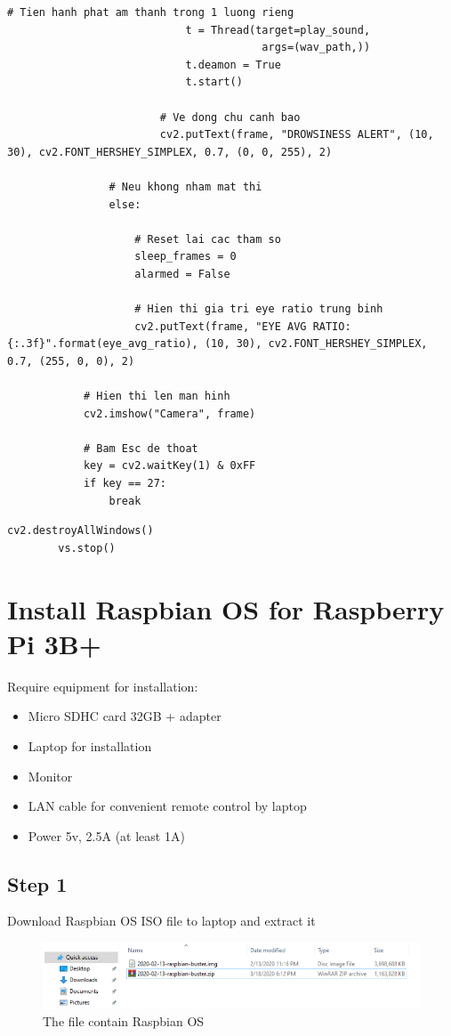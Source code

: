 \begin{lstlisting}[caption={Doc tu camera}]
                            # Tien hanh phat am thanh trong 1 luong rieng
                            t = Thread(target=play_sound,
                                        args=(wav_path,))
                            t.deamon = True
                            t.start()

                        # Ve dong chu canh bao
                        cv2.putText(frame, "DROWSINESS ALERT", (10, 30), cv2.FONT_HERSHEY_SIMPLEX, 0.7, (0, 0, 255), 2)

                # Neu khong nham mat thi
                else:

                    # Reset lai cac tham so
                    sleep_frames = 0
                    alarmed = False

                    # Hien thi gia tri eye ratio trung binh
                    cv2.putText(frame, "EYE AVG RATIO: {:.3f}".format(eye_avg_ratio), (10, 30),	cv2.FONT_HERSHEY_SIMPLEX, 0.7, (255, 0, 0), 2)

            # Hien thi len man hinh
            cv2.imshow("Camera", frame)

            # Bam Esc de thoat
            key = cv2.waitKey(1) & 0xFF
            if key == 27:
                break
    \end{lstlisting}

    \begin{lstlisting}[caption={End program}]
        cv2.destroyAllWindows()
        vs.stop()
    \end{lstlisting}

\section{Install Raspbian OS for Raspberry Pi 3B+}
    Require equipment for installation: 
    \begin{itemize}
        \item Micro SDHC card 32GB + adapter 
        \item Laptop for installation 
        \item Monitor 
        \item LAN cable for convenient remote control by laptop
        \item Power 5v, 2.5A (at least 1A) 
    \end{itemize}
    \subsection{Step 1}
        Download Raspbian OS ISO file to laptop and extract it
        \begin{figure}[H]
            \centering
            \includegraphics[width=0.8\linewidth]{img/download.PNG}
            \caption{The file contain Raspbian OS}
        \end{figure}
